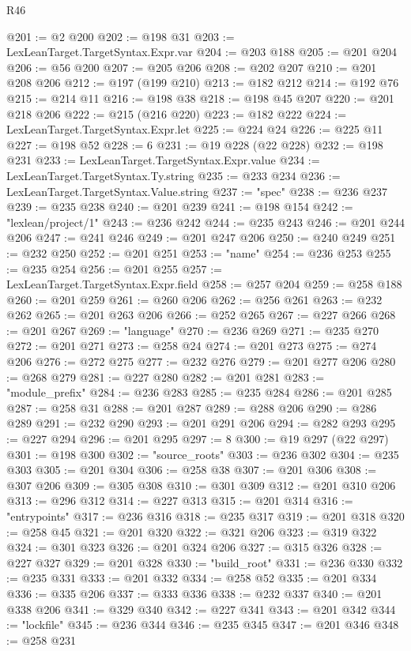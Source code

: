 \begin{lexlean}{R46}
\begin{coremodule}
@201 := @2 @200
@202 := @198 @31
@203 := LexLeanTarget.TargetSyntax.Expr.var
@204 := @203 @188
@205 := @201 @204
@206 := @56 @200
@207 := @205 @206
@208 := @202 @207
@210 := @201 @208 @206
@212 := @197 (@199 @210)
@213 := @182 @212
@214 := @192 @76
@215 := @214 @11
@216 := @198 @38
@218 := @198 @45 @207
@220 := @201 @218 @206
@222 := @215 (@216 @220)
@223 := @182 @222
@224 := LexLeanTarget.TargetSyntax.Expr.let
@225 := @224 @24
@226 := @225 @11
@227 := @198 @52
@228 := 6
@231 := @19 @228 (@22 @228)
@232 := @198 @231
@233 := LexLeanTarget.TargetSyntax.Expr.value
@234 := LexLeanTarget.TargetSyntax.Ty.string
@235 := @233 @234
@236 := LexLeanTarget.TargetSyntax.Value.string
@237 := "spec"
@238 := @236 @237
@239 := @235 @238
@240 := @201 @239
@241 := @198 @154
@242 := "lexlean/project/1"
@243 := @236 @242
@244 := @235 @243
@246 := @201 @244 @206
@247 := @241 @246
@249 := @201 @247 @206
@250 := @240 @249
@251 := @232 @250
@252 := @201 @251
@253 := "name"
@254 := @236 @253
@255 := @235 @254
@256 := @201 @255
@257 := LexLeanTarget.TargetSyntax.Expr.field
@258 := @257 @204
@259 := @258 @188
@260 := @201 @259
@261 := @260 @206
@262 := @256 @261
@263 := @232 @262
@265 := @201 @263 @206
@266 := @252 @265
@267 := @227 @266
@268 := @201 @267
@269 := "language"
@270 := @236 @269
@271 := @235 @270
@272 := @201 @271
@273 := @258 @24
@274 := @201 @273
@275 := @274 @206
@276 := @272 @275
@277 := @232 @276
@279 := @201 @277 @206
@280 := @268 @279
@281 := @227 @280
@282 := @201 @281
@283 := "module_prefix"
@284 := @236 @283
@285 := @235 @284
@286 := @201 @285
@287 := @258 @31
@288 := @201 @287
@289 := @288 @206
@290 := @286 @289
@291 := @232 @290
@293 := @201 @291 @206
@294 := @282 @293
@295 := @227 @294
@296 := @201 @295
@297 := 8
@300 := @19 @297 (@22 @297)
@301 := @198 @300
@302 := "source_roots"
@303 := @236 @302
@304 := @235 @303
@305 := @201 @304
@306 := @258 @38
@307 := @201 @306
@308 := @307 @206
@309 := @305 @308
@310 := @301 @309
@312 := @201 @310 @206
@313 := @296 @312
@314 := @227 @313
@315 := @201 @314
@316 := "entrypoints"
@317 := @236 @316
@318 := @235 @317
@319 := @201 @318
@320 := @258 @45
@321 := @201 @320
@322 := @321 @206
@323 := @319 @322
@324 := @301 @323
@326 := @201 @324 @206
@327 := @315 @326
@328 := @227 @327
@329 := @201 @328
@330 := "build_root"
@331 := @236 @330
@332 := @235 @331
@333 := @201 @332
@334 := @258 @52
@335 := @201 @334
@336 := @335 @206
@337 := @333 @336
@338 := @232 @337
@340 := @201 @338 @206
@341 := @329 @340
@342 := @227 @341
@343 := @201 @342
@344 := "lockfile"
@345 := @236 @344
@346 := @235 @345
@347 := @201 @346
@348 := @258 @231

\end{coremodule}
\end{lexlean}

